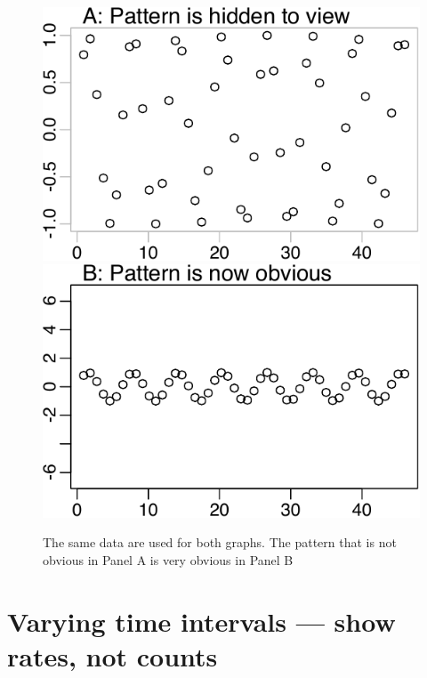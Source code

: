 \documentclass[
  10pt,
  b5paper]{book}
\begin{document}
\begin{figure}[H]
\includegraphics[width=0.48\linewidth]{03-graphs_files/figure-latex/Banking-1} \includegraphics[width=0.48\linewidth]{03-graphs_files/figure-latex/Banking-2} \caption{The same data are used for both graphs.  The pattern that is not
obvious in Panel A is very obvious in Panel B}\label{fig:Banking}
\end{figure}

\hypertarget{varying-time-intervals-show-rates-not-counts}{%
\section{Varying time intervals --- show rates, not counts}\label{varying-time-intervals-show-rates-not-counts}}
\end{document}
